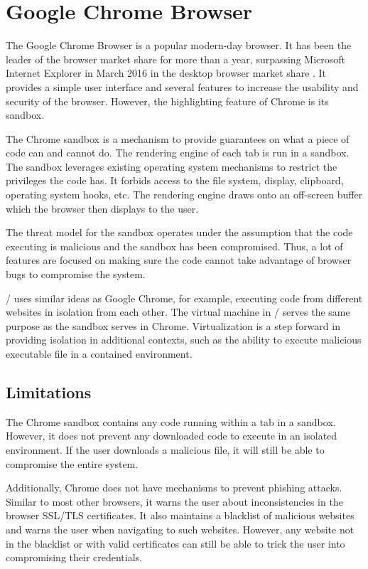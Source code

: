 \section{Google Chrome Browser}

The Google Chrome Browser is a popular modern-day browser. It has been the leader of the browser market share for more than a year, surpassing Microsoft Internet Explorer in March 2016 in the desktop browser market share \cite{marketsharereport}. It provides a simple user interface and several features to increase the usability and security of the browser. However, the highlighting feature of Chrome is its sandbox.

The Chrome sandbox \cite{chromesandbox} is a mechanism to provide guarantees on what a piece of code can and cannot do. The rendering engine of each tab is run in a sandbox. The sandbox leverages existing operating system mechanisms to restrict the privileges the code has. It forbids access to the file system, display, clipboard, operating system hooks, etc. The rendering engine draws onto an off-screen buffer which the browser then displays to the user.

The threat model for the sandbox operates under the assumption that the code executing is malicious and the sandbox has been compromised. Thus, a lot of features are focused on making sure the code cannot take advantage of browser bugs to compromise the system.

\namesecureworkstation/ uses similar ideas as Google Chrome, for example, executing code from different websites in isolation from each other. The virtual machine in \namesecureworkstation/ serves the same purpose as the sandbox serves in Chrome. Virtualization is a step forward in providing isolation in additional contexts, such as the ability to execute malicious executable file in a contained environment.

\subsection{Limitations}

The Chrome sandbox contains any code running within a tab in a sandbox. However, it does not prevent any downloaded code to execute in an isolated environment. If the user downloads a malicious file, it will still be able to compromise the entire system.

Additionally, Chrome does not have mechanisms to prevent phishing attacks. Similar to most other browsers, it warns the user about inconsistencies in the browser SSL/TLS certificates. It also maintains a blacklist of malicious websites and warns the user when navigating to such websites. However, any website not in the blacklist or with valid certificates can still be able to trick the user into compromising their credentials.

